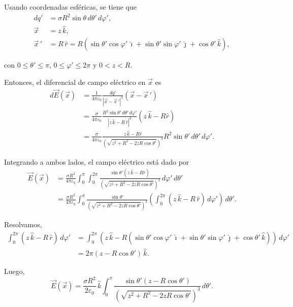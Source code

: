 \begin{ejemplo}
Usando coordenadas esféricas, se tiene que
\begin{align*}
    dq' &= \sigma R^2 \sin \theta\,d\theta'\,d\varphi', \\
    \Vec{x} &= z \, \hat{k}, \\
    \Vec{x}\,' &= R \,\hat{r} = R (\sin \theta' \cos \varphi' \, \hat{\imath} + \sin \theta' \sin\varphi' \,\hat{\jmath} + \cos \theta' \,\hat{k}),
\end{align*}

con $0 \leq \theta' \leq \pi$, $0 \leq \varphi' \leq 2\pi$ y $0 < z < R$.

Entonces, el diferencial de campo eléctrico en $\vec{x}$ es
\begin{align*}
    d\Vec{E}(\Vec{x}) &= \frac{1}{4\pi \varepsilon_0} \frac{dq'}{|\Vec{x} - \Vec{x}\,'|^3} (\Vec{x} - \Vec{x}\,') \\
    &= \frac{\sigma}{4\pi \varepsilon_0} \frac{R^2 \sin \theta'\, d\theta' \,d\varphi'}{|z\,\hat{k} - R\,\hat{r}|^3} (z\,\hat{k} - R \hat{r}) \\
    &= \frac{\sigma}{4\pi \varepsilon_0} \frac{z\,\hat{k} - R \hat{r}}{\left( \sqrt{z^2 + R^2 - 2zR \cos \theta'}\right)^3} R^2 \sin \theta' \,d\theta'\,d\varphi'.
\end{align*}

Integrando a ambos lados, el campo eléctrico está dado por
\begin{align*}
    \Vec{E}(\Vec{x}) &= \frac{\sigma R^2}{4\pi \varepsilon_0} \int_0^{\pi} \int_0^{2\pi} \frac{\sin \theta' (z\,\hat{k} - R \hat{r})}{\left( \sqrt{z^2 + R^2 - 2zR \cos \theta'}\right)^3} \,d\varphi'\,d\theta' \\
    &= \frac{\sigma R^2}{4\pi \varepsilon_0} \int_0^{\pi} \frac{\sin \theta'}{\left( \sqrt{z^2 + R^2 - 2zR \cos \theta'}\right)^3} \left( \int_0^{2\pi} (z\,\hat{k} - R \, \hat{r}) \,d\varphi'  \right)  \,d\theta'. 
\end{align*}

Resolvamos,
\begin{align*}
  \int_0^{2\pi} (z\,\hat{k} - R \, \hat{r}) \,d\varphi' &=    \int_0^{2\pi} (z\,\hat{k} - R (\sin \theta' \cos \varphi' \, \hat{\imath} + \sin \theta' \sin\varphi' \,\hat{\jmath} + \cos \theta' \,\hat{k})) \,d\varphi' \\
  &= 2\pi (z - R\cos\theta') \,\hat{k}.
\end{align*}

Luego,
$$\Vec{E}(\Vec{x}) = \frac{\sigma R^2}{2 \varepsilon_0} \,\hat{k} \int_0^{\pi} \frac{\sin \theta'(z-R \cos \theta')}{\left( \sqrt{z^2 + R^2 - 2zR \cos \theta'}\right)^3}   \,d\theta'.$$


\end{ejemplo}
